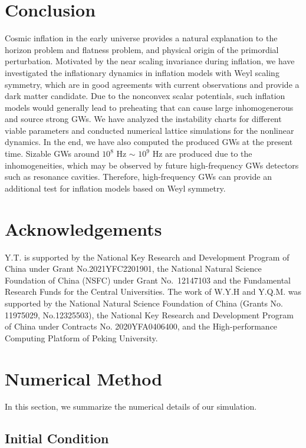 \documentclass[12pt, a4paper]{article}
\begin{document}
\section{Conclusion}

Cosmic inflation in the early universe provides a natural explanation to the horizon problem and flatness problem, and physical origin of the primordial perturbation. Motivated by the near scaling invariance during inflation, we have investigated the inflationary dynamics in inflation models with Weyl scaling symmetry, which are in good agreements with current observations and provide a dark matter candidate. Due to the nonconvex scalar potentials, such inflation models would generally lead to preheating that can cause large inhomogenerous and source strong GWs. We have analyzed the instability charts for different viable parameters and conducted numerical lattice simulations for the nonlinear dynamics. In the end, we have also computed the produced GWs at the present time. Sizable GWs around $10^8$ Hz $\sim$ $10^9$ Hz are produced due to the inhomogeneities, which may be observed by future high-frequency GWs detectors such as resonance cavities. Therefore, high-frequency GWs can provide an additional test for inflation models based on Weyl symmetry.

\section*{Acknowledgements}
\noindent Y.T. is supported by the National Key Research and Development Program of China under Grant No.2021YFC2201901, the National Natural Science Foundation of China (NSFC) under Grant No.~12147103 and the Fundamental Research Funds for the Central Universities. The work of W.Y.H and Y.Q.M. was supported by the National Natural Science Foundation of
China (Grants No. 11975029, No.12325503), the National Key Research and Development Program of China under
Contracts No. 2020YFA0406400, and the High-performance Computing Platform of Peking University. 

\appendix

\section{Numerical Method}
\label{appen:A}
In this section, we summarize the numerical details of our simulation.

\subsection{Initial Condition}
\end{document}
